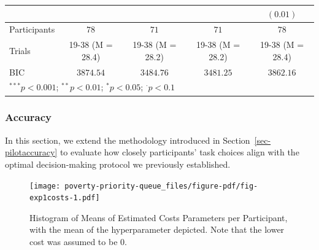 \documentclass[
]{article}
\begin{document}
\begin{table}
\begin{minipage}[t]{\linewidth}
{\begin{center}
\begin{tabular}{l c c c c}
                       &                  &                  &                  & $(0.01)$         \\
\hline
Participants           & $78$             & $71$             & $71$             & $78$             \\
Trials                 & 19-38 (M = 28.4) & 19-38 (M = 28.2) & 19-38 (M = 28.2) & 19-38 (M = 28.4) \\
BIC                    & $3874.54$        & $3484.76$        & $3481.25$        & $3862.16$        \\
\hline
\multicolumn{5}{l}{\scriptsize{$^{***}p<0.001$; $^{**}p<0.01$; $^{*}p<0.05$; $^{\cdot}p<0.1$}}
\end{tabular}

\label{table:coefficients}
\end{center}

}

\end{minipage}%

\end{table}

\hypertarget{accuracy}{%
\subsubsection{Accuracy}\label{accuracy}}

In this section, we extend the methodology introduced in
Section~\ref{sec-pilotaccuracy} to evaluate how closely participants'
task choices align with the optimal decision-making protocol we
previously established.

\begin{figure}

{\centering \texttt{[image: poverty-priority-queue\_files/figure-pdf/fig-exp1costs-1.pdf]}

}

\caption{\label{fig-exp1costs}Histogram of Means of Estimated Costs
Parameters per Participant, with the mean of the hyperparameter
depicted. Note that the lower cost was assumed to be 0.}

\end{figure}
\end{document}
